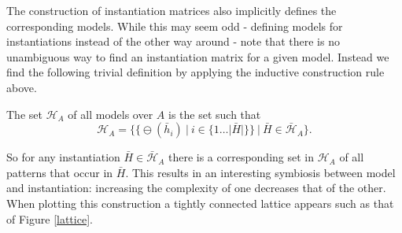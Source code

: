 \documentclass{llncs}
\begin{document}
The construction of instantiation matrices also implicitly defines the corresponding models. While this may seem odd - defining models for instantiations instead of the other way around - note that there is no unambiguous way to find an instantiation matrix for a given model. Instead we find the following trivial definition by applying the inductive construction rule above.
\begin{definition}
The set $\mathcal{H}_A$ of all models over $A$ is the set such that 
$$
\mathcal{H}_A=\Big\{\big\{\ominus(\bar{h}_{i}) \ | \ i \in \{1\dots |\bar{H}|\}\big\} \ \Big | \ \bar{H} \in \bar{\mathcal{H}}_A \Big\}.
$$ 
\end{definition}
So for any instantiation $\bar{H}\in \bar{\mathcal{H}}_A$ there is a corresponding set in $\mathcal{H}_A$ of all patterns that occur in $\bar{H}$. This results in an interesting symbiosis between model and instantiation: increasing the complexity of one decreases that of the other. When plotting this construction a tightly connected lattice appears such as that of Figure \ref{lattice}. 
\end{document}

